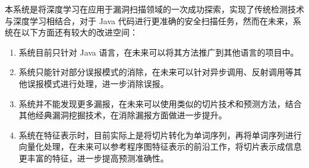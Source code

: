 本系统是将深度学习在应用于漏洞扫描领域的一次成功探索，实现了传统检测技术与深度学习相结合，对于 Java 代码进行更准确的安全扫描任务，然而在未来，系统在以下方面还有较大的改进空间：

\begin{enumerate}
    \item 系统目前只针对 Java 语言，在未来可以将其方法推广到其他语言的项目中。
    \item 系统只能针对部分误报模式的消除，在未来可以针对异步调用、反射调用等其他误报模式进行处理，进一步消除误报。
    \item 系统并不能发现更多漏报，在未来可以使用类似的切片技术和预测方法，结合其他经典漏洞挖掘技术，在消除漏报方面做进一步提升。
    \item 系统在特征表示时，目前实际上是将切片转化为单词序列，再将单词序列进行向量化处理，在未来可以参考程序图特征表示的前沿工作，将切片表示成信息更丰富的特征，进一步提高预测准确性。
\end{enumerate}